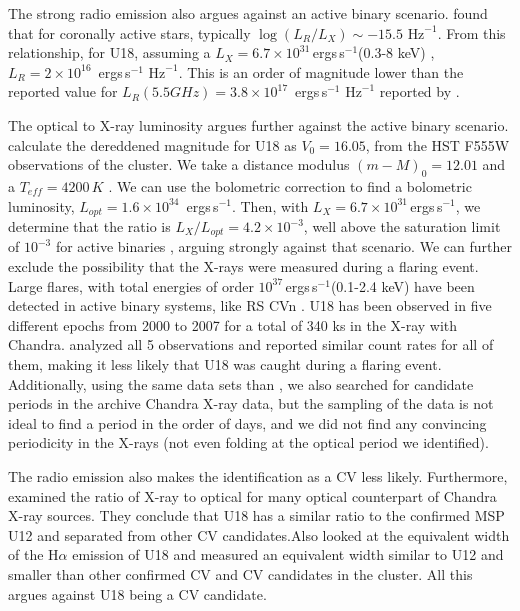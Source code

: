 \documentclass[fleqn,usenatbib,useAMS,letters]{mnras}
\newcommand{\ergs}{\,ergs\,s$^{-1}$} %
\begin{document}
 
 The strong radio emission also argues against an active binary scenario. \citet{Guedel1993} found that for coronally active stars, typically $\log(L_R/L_X) \sim -15.5 \text{ Hz}^{-1}$. From this relationship, for U18, assuming a $L_X= 6.7 \times 10 ^{31}$\ergs (0.3-8 keV) \citep{bogdanov_chandra_2010}, $L_R = 2 \times 10^{16}$ \ergs $\text{ Hz}^{-1}$. This is an order of magnitude lower than the reported value for $L_R (5.5 GHz) = 3.8\times 10^{17}$ \ergs $\text{ Hz}^{-1}$ reported by \citet{CoryPaper}. 
 

 
 The optical to X-ray luminosity argues further against the active binary scenario. \cite{Pallanca2017Halpha} calculate the dereddened  magnitude for U18 as $V_0 = 16.05$, from the HST F555W observations of the cluster. We take a distance modulus $(m-M)_0 = 12.01$ \citep{Gratton2003} and a $T_{eff} = 4200 \, K$ \citep{Husser2016MUSE}. We can use the \cite{Flower1996BC} bolometric correction to find a bolometric luminosity, $L_{opt} = 1.6 \times 10^{34}$ \ergs.  Then, with $L_X= 6.7 \times 10 ^{31}$\ergs \citep[0.3-8 keV;][]{bogdanov_chandra_2010}, we determine that the ratio is $L_X/L_{opt} = 4.2 \times 10^{-3}$, well above the saturation limit of $10^{-3}$ for active binaries \citep{VilhuSaturation2,VilhuSaturationLimit}, arguing strongly against that scenario. We can further exclude the possibility that the X-rays were measured during a flaring event. Large flares, with total energies of order $10^{37}$\ergs  (0.1-2.4 keV) have been detected in active binary systems, like RS CVn \citep[e.g.,][]{Kuerster1996}. U18 has been observed in five different epochs from 2000 to 2007 for a total of 340 ks in the X-ray with Chandra. \citet{bogdanov_chandra_2010} analyzed all 5 observations and reported similar count rates for all of them, making it less likely that U18 was caught during a flaring event. 
Additionally, using the same data sets than \citet{bogdanov_chandra_2010}, we also searched for candidate periods in the archive Chandra X-ray data, but the sampling of the data is not ideal to find a period in the order of days, and we did not find any convincing periodicity in the X-rays (not even folding at the optical period we identified). 

 
 The radio emission also makes the identification as a CV less likely. Furthermore, \cite{cohn_identification_2010} examined the ratio of X-ray to optical for many optical counterpart of Chandra X-ray sources. They conclude that U18 has a similar ratio to the confirmed MSP U12 and separated from other CV candidates.Also  \cite{Pallanca2017Halpha} looked at the equivalent width of the H$\alpha$ emission of U18 and measured an equivalent width similar to U12 and smaller than other confirmed CV and CV candidates in the cluster. All this argues against U18 being a CV candidate.
 
\end{document}
